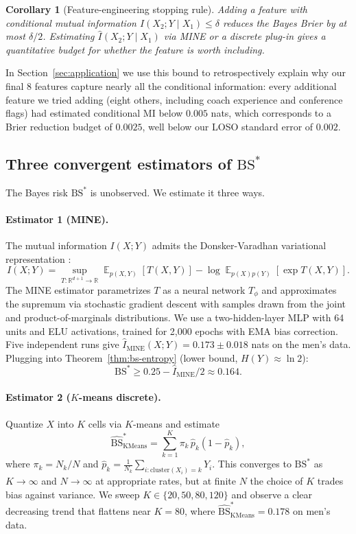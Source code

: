 \documentclass[11pt,a4paper]{article}
\newtheorem{corollary}[theorem]{Corollary}
\theoremstyle{definition}
\DeclareMathOperator{\E}{\mathbb{E}}
\newcommand{\R}{\mathbb{R}}
\newcommand{\BS}{\mathrm{BS}}
\begin{document}
\begin{corollary}[Feature-engineering stopping rule]\label{cor:fe-stop}
Adding a feature with conditional mutual information $I(X_2; Y \mid X_1) \le \delta$ reduces the Bayes Brier by at most $\delta / 2$. Estimating $\hat{I}(X_2; Y \mid X_1)$ via MINE or a discrete plug-in gives a quantitative budget for whether the feature is worth including.
\end{corollary}

In Section~\ref{sec:application} we use this bound to retrospectively explain why our final 8 features capture nearly all the conditional information: every additional feature we tried adding (eight others, including coach experience and conference flags) had estimated conditional MI below $0.005$ nats, which corresponds to a Brier reduction budget of $0.0025$, well below our LOSO standard error of $0.002$.

\subsection{Three convergent estimators of \texorpdfstring{$\BS^*$}{BS*}}

The Bayes risk $\BS^*$ is unobserved. We estimate it three ways.

\paragraph{Estimator 1 (MINE).} The mutual information $I(X; Y)$ admits the Donsker-Varadhan variational representation \citep{donsker1983}:
\[
I(X; Y) = \sup_{T: \R^{d+1} \to \R} \E_{p(X,Y)}[T(X, Y)] - \log \E_{p(X)p(Y)}[\exp T(X, Y)].
\]
The MINE estimator \citep{belghazi2018} parametrizes $T$ as a neural network $T_\phi$ and approximates the supremum via stochastic gradient descent with samples drawn from the joint and product-of-marginals distributions. We use a two-hidden-layer MLP with 64 units and ELU activations, trained for 2{,}000 epochs with EMA bias correction. Five independent runs give $\hat{I}_{\text{MINE}}(X; Y) = 0.173 \pm 0.018$ nats on the men's data. Plugging into Theorem~\ref{thm:bs-entropy} (lower bound, $H(Y) \approx \ln 2$):
\[
\BS^* \ge 0.25 - \hat{I}_{\text{MINE}} / 2 \approx 0.164.
\]

\paragraph{Estimator 2 ($K$-means discrete).} Quantize $X$ into $K$ cells via $K$-means and estimate
\[
\hat{\BS}^*_{\text{KMeans}} = \sum_{k=1}^K \pi_k \, \hat{p}_k (1 - \hat{p}_k),
\]
where $\pi_k = N_k / N$ and $\hat{p}_k = \frac{1}{N_k} \sum_{i: \mathrm{cluster}(X_i) = k} Y_i$. This converges to $\BS^*$ as $K \to \infty$ and $N \to \infty$ at appropriate rates, but at finite $N$ the choice of $K$ trades bias against variance. We sweep $K \in \{20, 50, 80, 120\}$ and observe a clear decreasing trend that flattens near $K = 80$, where $\hat{\BS}^*_{\text{KMeans}} = 0.178$ on men's data.
\end{document}
